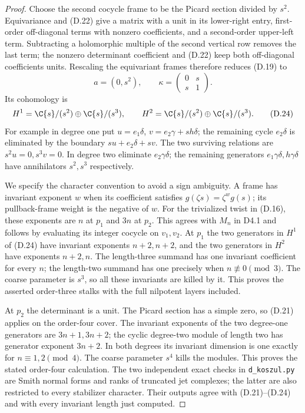 \begin{proof}
Choose the second cocycle frame to be the Picard section divided by
$s^2$. Equivariance and (D.22) give a matrix with a unit in its
lower-right entry, first-order off-diagonal terms with nonzero
coefficients, and a second-order upper-left term. Subtracting a
holomorphic multiple of the second vertical row removes the last
term; the nonzero determinant coefficient and (D.22) keep both
off-diagonal coefficients units. Rescaling the equivariant frames
therefore reduces (D.19) to
\[
 a=(0,s^2),\qquad \kappa=\begin{pmatrix}0&s\\s&1\end{pmatrix}. \tag{D.23}
\]
Its cohomology is
\[
 H^1=\C\{s\}/(s^2)\oplus\C\{s\}/(s^3),\qquad
 H^2=\C\{s\}/(s^2)\oplus\C\{s\}/(s^3).             \tag{D.24}
\]
For example in degree one put
$u=e_1\delta$, $v=e_2\gamma+s h\delta$; the remaining cycle
$e_2\delta$ is eliminated by the boundary
$s u+e_2\delta+s v$. The two surviving relations are
$s^2u=0,s^3v=0$. In degree two eliminate $e_2\gamma\delta$;
the remaining generators $e_1\gamma\delta,h\gamma\delta$
have annihilators $s^2,s^3$ respectively.

We specify the character convention to avoid a sign ambiguity.
A frame has invariant exponent $w$ when its coefficient satisfies
$g(\zeta s)=\zeta^w g(s)$; its pullback-frame weight is the negative
of $w$. For the trivialized twist in (D.16), these exponents are
$n$ at $p_1$ and $3n$ at $p_2$. This agrees with $M_n$ in D4.1
and follows by evaluating its integer cocycle on $v_1,v_2$.
At $p_1$ the two generators in $H^1$ of (D.24) have invariant
exponents $n+2,n+2$, and the two generators in $H^2$ have exponents
$n+2,n$. The length-three summand has one invariant coefficient
for every $n$; the length-two summand has one precisely when
$n\not\equiv0\pmod3$. The coarse parameter is $s^3$, so all these
invariants are killed by it. This proves the asserted order-three
stalks with the full nilpotent layers included.

At $p_2$ the determinant is a unit. The Picard section has a simple
zero, so (D.21) applies on the order-four cover. The invariant
exponents of the two degree-one generators are $3n+1,3n+2$;
the cyclic degree-two module of length two has generator exponent
$3n+2$. In both degrees its invariant dimension is one exactly for
$n\equiv1,2\pmod4$. The coarse parameter $s^4$ kills the modules.
This proves the stated order-four calculation. The two independent
exact checks in \texttt{d\_koszul.py} are Smith normal forms and
ranks of truncated jet complexes; the latter are also restricted to
every stabilizer character. Their outputs agree with (D.21)--(D.24)
and with every invariant length just computed.
\end{proof}

